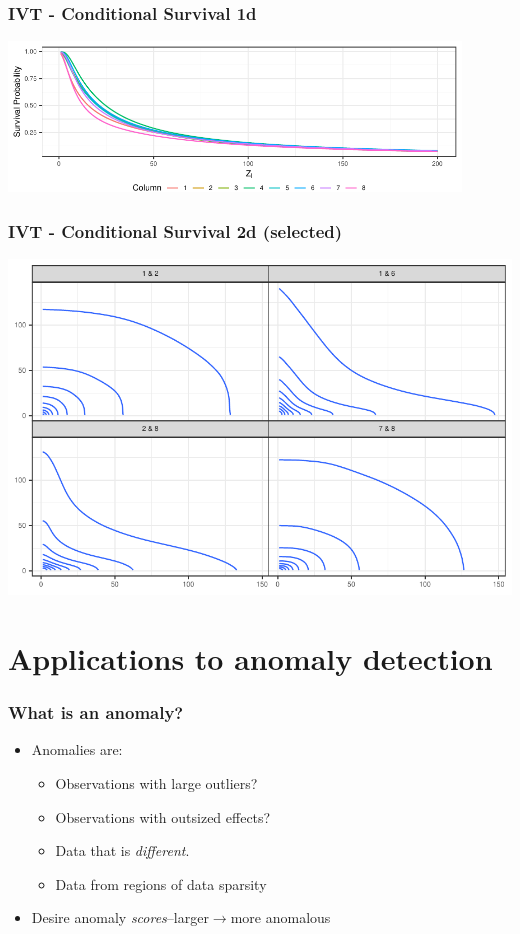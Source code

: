 \documentclass[aspectratio=169]{beamer}
\newlength{\frametextheight}
\begin{document}
\begin{frame}
  \frametitle{IVT - Conditional Survival 1d}
  \begin{center}
    \includegraphics[height=0.8\frametextheight,width=0.9\textwidth]{./images/condsurv_1d}
  \end{center}
\end{frame}

\begin{frame}
  \frametitle{IVT - Conditional Survival 2d (selected)}
  \begin{center}
    \includegraphics[height=\frametextheight,width=\frametextheight]{./images/condsurv_2d}
  \end{center}
\end{frame}

\section[Anomaly]{Applications to anomaly detection}

\begin{frame}
  \frametitle{What is an anomaly?}
  \begin{itemize}
    \item Anomalies are:
      \begin{itemize}
        \item Observations with large outliers?
        \item Observations with outsized effects?
        \item Data that is \emph{different}.
        \item Data from regions of data sparsity
      \end{itemize}
    \item Desire anomaly \emph{scores}--larger$\rightarrow$more anomalous
  \end{itemize}
\end{frame}
\end{document}
